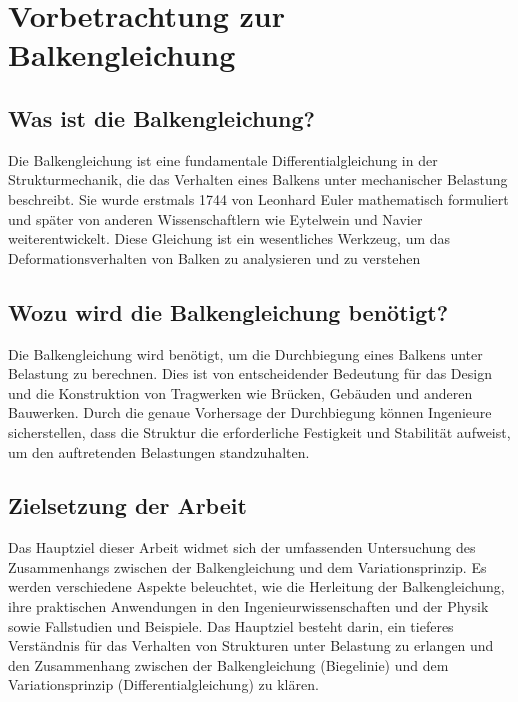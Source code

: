 %
%
%
%
\section{Vorbetrachtung zur Balkengleichung\label{balken:section:teil0}}
\subsection{Was ist die Balkengleichung?}
Die Balkengleichung ist eine fundamentale Differentialgleichung in der Strukturmechanik, die das Verhalten eines Balkens unter mechanischer Belastung beschreibt. \cite{balken:Balkentheorie}
Sie wurde erstmals 1744 von Leonhard Euler mathematisch formuliert und später von anderen Wissenschaftlern wie Eytelwein und Navier weiterentwickelt. 
Diese Gleichung ist ein wesentliches Werkzeug, um das Deformationsverhalten von Balken zu analysieren und zu verstehen \cite{balken:Biegelinie}

\subsection{Wozu wird die Balkengleichung benötigt?}
Die Balkengleichung wird benötigt, um die Durchbiegung eines Balkens unter Belastung zu berechnen.
Dies ist von entscheidender Bedeutung für das Design und die Konstruktion von Tragwerken wie Brücken, Gebäuden und anderen Bauwerken. 
Durch die genaue Vorhersage der Durchbiegung können Ingenieure sicherstellen, dass die Struktur die erforderliche Festigkeit und Stabilität aufweist, um den auftretenden Belastungen standzuhalten.

\subsection{Zielsetzung der Arbeit}
Das Hauptziel dieser Arbeit widmet sich der umfassenden Untersuchung des Zusammenhangs zwischen der Balkengleichung und dem Variationsprinzip. 
Es werden verschiedene Aspekte beleuchtet, wie die Herleitung der Balkengleichung, ihre praktischen Anwendungen in den Ingenieurwissenschaften und der Physik sowie Fallstudien und Beispiele. 
Das Hauptziel besteht darin, ein tieferes Verständnis für das Verhalten von Strukturen unter Belastung zu erlangen und den Zusammenhang zwischen der Balkengleichung (Biegelinie) und dem Variationsprinzip (Differentialgleichung) zu klären.

